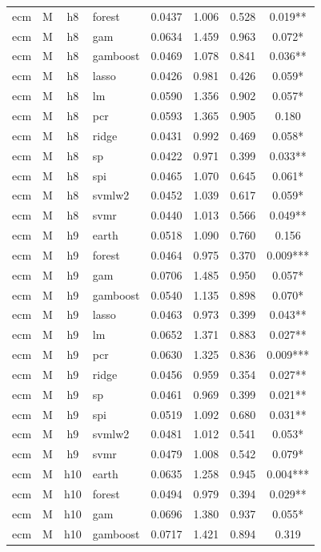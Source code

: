 \begin{ThreePartTable}
\begin{longtable}[t]{llclcccc}
ecm & M & h8 & forest & 0.0437 & 1.006 & 0.528 & 0.019**\\
ecm & M & h8 & gam & 0.0634 & 1.459 & 0.963 & 0.072*\\
ecm & M & h8 & gamboost & 0.0469 & 1.078 & 0.841 & 0.036**\\
ecm & M & h8 & lasso & 0.0426 & 0.981 & 0.426 & 0.059*\\
ecm & M & h8 & lm & 0.0590 & 1.356 & 0.902 & 0.057*\\
ecm & M & h8 & pcr & 0.0593 & 1.365 & 0.905 & 0.180\\
ecm & M & h8 & ridge & 0.0431 & 0.992 & 0.469 & 0.058*\\
ecm & M & h8 & sp & 0.0422 & 0.971 & 0.399 & 0.033**\\
ecm & M & h8 & spi & 0.0465 & 1.070 & 0.645 & 0.061*\\
ecm & M & h8 & svmlw2 & 0.0452 & 1.039 & 0.617 & 0.059*\\
ecm & M & h8 & svmr & 0.0440 & 1.013 & 0.566 & 0.049**\\
\addlinespace
ecm & M & h9 & earth & 0.0518 & 1.090 & 0.760 & 0.156\\
ecm & M & h9 & forest & 0.0464 & 0.975 & 0.370 & 0.009***\\
ecm & M & h9 & gam & 0.0706 & 1.485 & 0.950 & 0.057*\\
ecm & M & h9 & gamboost & 0.0540 & 1.135 & 0.898 & 0.070*\\
ecm & M & h9 & lasso & 0.0463 & 0.973 & 0.399 & 0.043**\\
ecm & M & h9 & lm & 0.0652 & 1.371 & 0.883 & 0.027**\\
ecm & M & h9 & pcr & 0.0630 & 1.325 & 0.836 & 0.009***\\
ecm & M & h9 & ridge & 0.0456 & 0.959 & 0.354 & 0.027**\\
ecm & M & h9 & sp & 0.0461 & 0.969 & 0.399 & 0.021**\\
ecm & M & h9 & spi & 0.0519 & 1.092 & 0.680 & 0.031**\\
ecm & M & h9 & svmlw2 & 0.0481 & 1.012 & 0.541 & 0.053*\\
ecm & M & h9 & svmr & 0.0479 & 1.008 & 0.542 & 0.079*\\
\addlinespace
ecm & M & h10 & earth & 0.0635 & 1.258 & 0.945 & 0.004***\\
ecm & M & h10 & forest & 0.0494 & 0.979 & 0.394 & 0.029**\\
ecm & M & h10 & gam & 0.0696 & 1.380 & 0.937 & 0.055*\\
ecm & M & h10 & gamboost & 0.0717 & 1.421 & 0.894 & 0.319\\

\end{longtable}
\end{ThreePartTable}
